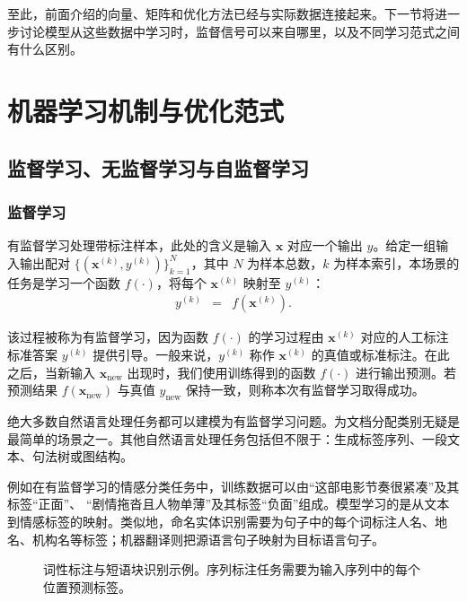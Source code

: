 至此，前面介绍的向量、矩阵和优化方法已经与实际数据连接起来。下一节将进一步讨论模型从这些数据中学习时，监督信号可以来自哪里，以及不同学习范式之间有什么区别。

\section{机器学习机制与优化范式}



\subsection{监督学习、无监督学习与自监督学习}

\subsubsection{监督学习}
有监督学习处理带标注样本，此处的含义是输入 $\mathbf{x}$ 对应一个输出 $y$。给定一组输入输出配对 $\{(\mathbf{x}^{(k)},y^{(k)})\}_{k=1}^{N}$，其中 $N$ 为样本总数，$k$ 为样本索引，本场景的任务是学习一个函数 $f(\cdot)$，将每个 $\mathbf{x}^{(k)}$ 映射至 $y^{(k)}$：
\begin{eqnarray}
y^{(k)} & = & f(\mathbf{x}^{(k)}).
\end{eqnarray}

\noindent 该过程被称为有监督学习，因为函数 $f(\cdot)$ 的学习过程由 $\mathbf{x}^{(k)}$ 对应的人工标注标准答案 $y^{(k)}$ 提供引导。一般来说，$y^{(k)}$ 称作 $\mathbf{x}^{(k)}$ 的真值或标准标注。在此之后，当新输入 $\mathbf{x}_{\mathrm{new}}$ 出现时，我们使用训练得到的函数 $f(\cdot)$ 进行输出预测。若预测结果 $f(\mathbf{x}_{\mathrm{new}})$ 与真值 $y_{\mathrm{new}}$ 保持一致，则称本次有监督学习取得成功。

绝大多数自然语言处理任务都可以建模为有监督学习问题。为文档分配类别无疑是最简单的场景之一。其他自然语言处理任务包括但不限于：生成标签序列、一段文本、句法树或图结构。


例如在有监督学习的情感分类任务中，训练数据可以由“这部电影节奏很紧凑”及其标签“正面”、 “剧情拖沓且人物单薄”及其标签“负面”组成。模型学习的是从文本到情感标签的映射。类似地，命名实体识别需要为句子中的每个词标注人名、地名、机构名等标签；机器翻译则把源语言句子映射为目标语言句子。

\begin{figure}[htbp]
  \centering
  \resizebox{0.98\linewidth}{!}{%
  }
  \caption{词性标注与短语块识别示例。序列标注任务需要为输入序列中的每个位置预测标签。}
  \label{fig:nlpbook-pos-tagging-chunking}
\end{figure}

